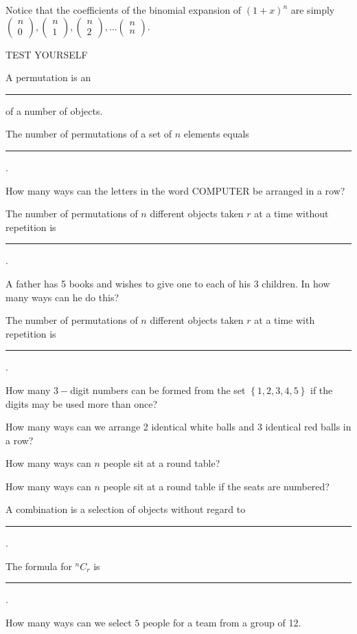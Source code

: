 \documentclass[11pt,a4paper]{book}
\begin{document}
Notice that the coefficients of the binomial expansion of $\left(1+x\right)^{n}$
are simply $\begin{pmatrix}n\\
0
\end{pmatrix},\begin{pmatrix}n\\
1
\end{pmatrix},\begin{pmatrix}n\\
2
\end{pmatrix},\ldots\begin{pmatrix}n\\
n
\end{pmatrix}$.

\newpage

\begin{testyourself}{TEST YOURSELF}
\begin{tasks}[label=(\alph*),label-width=3.5ex] 

\task  A permutation is an \rule{4cm}{0.5pt} of a number of objects.

\task  The number of permutations of a set of $n$ elements equals
\rule{2cm}{0.5pt}.

\task  How many ways can the letters in the word COMPUTER be arranged
in a row? 

\task  The number of permutations of $n$ different objects taken
$r$ at a time without repetition\textbf{ }is \rule{2cm}{0.5pt}.

\task  A father has 5 books and wishes to give one to each of his
3 children. In how many ways can he do this? 

\task  The number of permutations of $n$ different objects taken
$r$ at a time with repetition\textbf{ }is \rule{2cm}{0.5pt}.

\task  How many $3-$digit numbers can be formed from the set $\left\{ 1,2,3,4,5\right\} $
if the digits may be used more than once?

\task  How many ways can we arrange 2 identical white balls and 3
identical red balls in a row?

\task  How many ways can $n$ people sit at a round table? 

\task  How many ways can $n$ people sit at a round table if the
seats are numbered? 

\task  A combination is a selection of objects without regard to
\rule{4cm}{0.5pt}.

\task  The formula for $^{n}C_{r}$ is \rule{2cm}{0.5pt}.

\task How many ways can we select $5$ people for a team from a group
of 12.

\end{tasks}
\end{testyourself}
\end{document}

